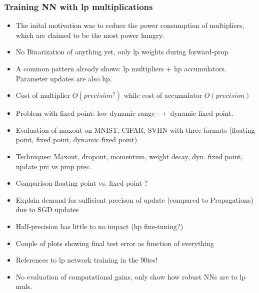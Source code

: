 \documentclass{article}
\begin{document}
\subsubsection*{Training NN with lp multiplications}
    \begin{itemize}
    \item The inital motivation was to reduce the power consumption of multipliers,
    which are claimed to be the most power hungry.
    \item No Binarization of anything yet, only lp weights during forward-prop
    \item A common pattern already shows: lp multipliers + hp accumulators.
    Parameter updates are also hp.
    \item Cost of multiplier $O(precision^2)$ while cost of accumulator $O(precision)$
    \item Problem with fixed point: low dynamic range $\rightarrow$ dynamic fixed point.
    \item Evaluation of maxout on MNIST, CIFAR, SVHN with three formats (floating
    point, fixed point, dynamic fixed point)
    \item Techniques: Maxout, dropout, momentum, weight decay, dyn. fixed point,
    update prc vs prop prec.
    \item Comparison floating point vs. fixed point ?
    \item Explain demand for sufficient precison of update (compared to Propagations)
    due to SGD updates
    \item Half-precision has little to no impact (hp fine-tuning?)
    \item Couple of plots showing final test error as function of everything
    \item References to lp network training in the 90ies!
    \item No evaluation of computational gains, only show how robust NNs are to lp muls.
    \end{itemize}
\end{document}
